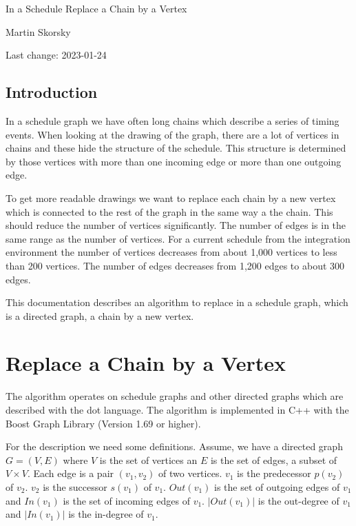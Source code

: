 \documentclass[12pt,a4paper]{report}
\begin{document}
\begin{titlepage}
\vspace{2cm}
\begin{center}
\Huge{In a Schedule Replace a Chain by a Vertex}

\Large{Martin Skorsky}

\Large{Last change: 2023-01-24}
\end{center}
\vfill
\end{titlepage}

\tableofcontents

\section*{Introduction}
In a schedule graph we have often long chains which describe a series of timing events.
When looking at the drawing of the graph, there are a lot of vertices in chains and
these hide the structure of the schedule. This structure is determined by those
vertices with more than one incoming edge or more than one outgoing edge.

To get more readable drawings we want to replace each chain by a new vertex which is
connected to the rest of the graph in the same way a the chain. This should reduce
the number of vertices significantly. The number of edges is in the same range as
the number of vertices. For a current schedule from the integration environment
the number of vertices decreases from about 1,000 vertices to less than 200 vertices.
The number of edges decreases from 1,200 edges to about 300 edges.

This documentation describes an algorithm to replace in a schedule graph, which is a
directed graph, a chain by a new vertex.

\chapter{Replace a Chain by a Vertex}
The algorithm operates on schedule graphs and other directed graphs which are described
with the dot language.
The algorithm is implemented in C++ with the Boost Graph Library (Version 1.69 or higher).

For the description we need some definitions. Assume, we have a directed graph $G = (V,E)$ where
$V$ is the set of vertices an $E$ is the set of edges, a subset of $V \times V$. Each
edge is a pair $(v_1, v_2)$ of two vertices. $v_1$ is the predecessor $p(v_2)$ of $v_2$. $v_2$ is
the successor $s(v_1)$ of $v_1$. $Out(v_1)$ is the set of outgoing edges of $v_1$ and $In(v_1)$
is the set of incoming edges of $v_1$. $|Out(v_1)|$ is the out-degree of $v_1$ and $|In(v_1)|$
is the in-degree of $v_1$.
\end{document}
